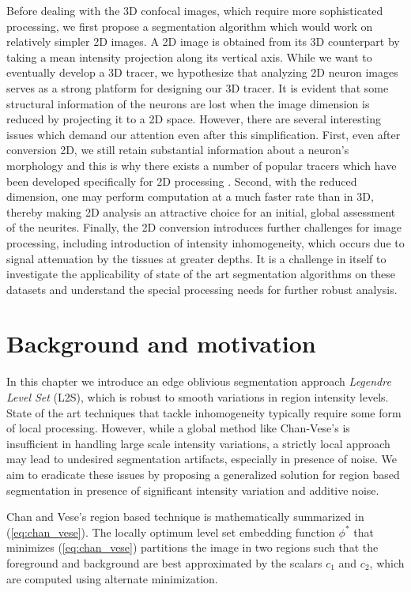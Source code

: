 Before dealing with the 3D confocal images, which require more sophisticated processing, we first propose a segmentation algorithm which would work on relatively simpler 2D images. A 2D image is obtained from its 3D counterpart by taking a mean intensity projection along its vertical axis. While we want to eventually develop a 3D tracer, we hypothesize that analyzing 2D neuron images serves as a strong platform for designing our 3D tracer. It is evident that some structural information of the neurons are lost when the image dimension is reduced by projecting it to a 2D space. However, there are several interesting issues which demand our attention even after this simplification. First, even after conversion  2D, we still retain substantial information about a neuron's morphology and this is why there exists a number of popular tracers which have been developed specifically for 2D processing \cite{basu2010tree2tree,meijering2004design}. Second, with the reduced dimension, one may perform computation at a much faster rate than in 3D, thereby making 2D analysis an attractive choice for an initial, global assessment of the neurites. Finally, the 2D conversion introduces further challenges for image processing, including introduction of intensity inhomogeneity, which occurs due to signal attenuation by the tissues at greater depths. It is a challenge in itself to investigate the applicability of state of the art segmentation algorithms on these datasets and understand the special processing needs for further robust analysis.

\section{Background and motivation}
In this chapter we introduce an edge oblivious segmentation approach \emph{Legendre Level Set} (L2S), which is robust to smooth variations in region intensity levels. State of the art techniques that tackle inhomogeneity typically require some form of local processing. However, while a global method like Chan-Vese's is insufficient in handling large scale intensity variations, a strictly local approach may lead to undesired segmentation artifacts, especially in presence of noise. We aim to eradicate these issues by proposing a generalized solution for region based segmentation in presence of significant intensity variation and additive noise. 

Chan and Vese's region based technique is mathematically summarized in (\ref{eq:chan_vese}). The locally optimum level set embedding function $\phi^*$ that minimizes (\ref{eq:chan_vese}) partitions the image in two regions such that the foreground and background are best approximated by the scalars $c_1$ and $c_2$, which are computed using alternate minimization.

